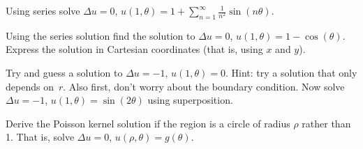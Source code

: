 \setcounter{exercise}{100}

\begin{exercise}
Using series solve
$\Delta u = 0$, $u(1,\theta) = 1+ \sum\limits_{n=1}^\infty \frac{1}{n^2}\sin(n\theta)$.
\end{exercise}

\begin{exercise}
Using the series solution find the solution to
$\Delta u = 0$, $u(1,\theta) = 1- \cos(\theta)$.  Express the solution
in Cartesian coordinates (that is, using $x$ and $y$).
\end{exercise}

\begin{exercise}
\leavevmode
\begin{tasks}
\task
Try and guess a solution to $\Delta u = -1$, $u(1,\theta) = 0$.
Hint: try a solution that only depends on~$r$.  Also first, don't worry
about the boundary condition.
\task
Now solve $\Delta u = -1$, $u(1,\theta) = \sin(2\theta)$ using
superposition.
\end{tasks}
\end{exercise}

\begin{exercise}[challenging]
Derive the Poisson kernel solution
if the region is a circle of radius $\rho$ rather
than 1.  That is, solve $\Delta u = 0$, $u(\rho,\theta) = g(\theta)$.
\end{exercise}
